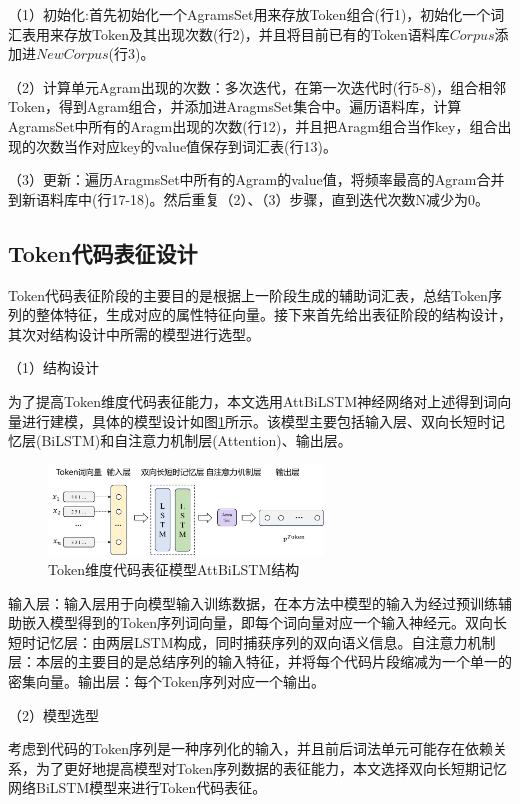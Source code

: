 （1）初始化:首先初始化一个AgramsSet用来存放Token组合(行1)，初始化一个词汇表用来存放Token及其出现次数(行2)，并且将目前已有的Token语料库$Corpus$添加进$NewCorpus$(行3)。

（2）计算单元Agram出现的次数：多次迭代，在第一次迭代时(行5-8)，组合相邻Token，得到Agram组合，并添加进AragmsSet集合中。遍历语料库，计算AgramsSet中所有的Aragm出现的次数(行12)，并且把Aragm组合当作key，组合出现的次数当作对应key的value值保存到词汇表(行13)。

（3）更新：遍历AragmsSet中所有的Agram的value值，将频率最高的Agram合并到新语料库中(行17-18)。然后重复（2）、（3）步骤，直到迭代次数N减少为0。

\subsection{Token代码表征设计}
\label{subsec:TokenModel}

Token代码表征阶段的主要目的是根据上一阶段生成的辅助词汇表，总结Token序列的整体特征，生成对应的属性特征向量。接下来首先给出表征阶段的结构设计，其次对结构设计中所需的模型进行选型。

（1）结构设计

为了提高Token维度代码表征能力，本文选用AttBiLSTM神经网络对上述得到词向量进行建模，具体的模型设计如图\ref{fig:tokenmodel}所示。该模型主要包括输入层、双向长短时记忆层(BiLSTM)和自注意力机制层(Attention)、输出层。
\begin{figure}[htp]
  \centering
  \includegraphics[width=0.65\textwidth]{figures/tokenmodel}
  \caption{Token维度代码表征模型AttBiLSTM结构}\label{fig:tokenmodel}
\end{figure}

输入层：输入层用于向模型输入训练数据，在本方法中模型的输入为经过预训练辅助嵌入模型得到的Token序列词向量，即每个词向量对应一个输入神经元。双向长短时记忆层：由两层LSTM构成，同时捕获序列的双向语义信息。自注意力机制层：本层的主要目的是总结序列的输入特征，并将每个代码片段缩减为一个单一的密集向量。输出层：每个Token序列对应一个输出。

（2）模型选型

考虑到代码的Token序列是一种序列化的输入，并且前后词法单元可能存在依赖关系，为了更好地提高模型对Token序列数据的表征能力，本文选择双向长短期记忆网络BiLSTM模型来进行Token代码表征。

